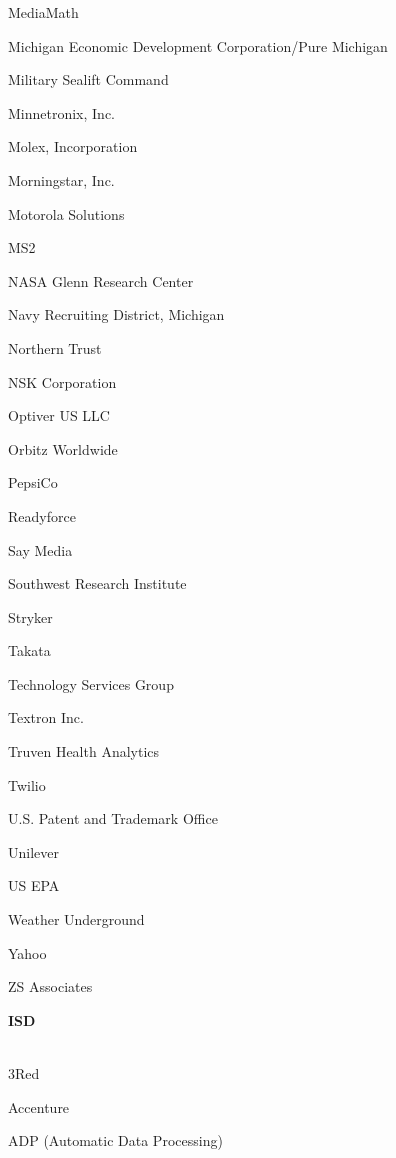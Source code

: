 \documentclass[twoside]{article}
\begin{document}
\begin{center}
\begin{multicols}{5}
\begin{FlushLeft}
\begin{compactitem}
\item MediaMath
\item Michigan Economic Development Corporation/Pure Michigan
\item Military Sealift Command
\item Minnetronix, Inc.
\item Molex, Incorporation
\item Morningstar, Inc.
\item Motorola Solutions
\item MS2
\item NASA Glenn Research Center
\item Navy Recruiting District, Michigan
\item Northern Trust
\item NSK Corporation
\item Optiver US LLC
\item Orbitz Worldwide
\item PepsiCo
\item Readyforce
\item Say Media
\item Southwest Research Institute
\item Stryker
\item Takata
\item Technology Services Group
\item Textron Inc.
\item Truven Health Analytics
\item Twilio
\item U.S. Patent and Trademark Office
\item Unilever
\item US EPA
\item Weather Underground
\item Yahoo
\item ZS Associates
\end{compactitem}
        \end{FlushLeft}
        \vspace{1em}
        {\fontsize{14}{16}\selectfont \bf ISD}\\
        \vspace{-1em}
        ~\hrulefill~
        \vspace{-.9em}
        \begin{FlushLeft}
        \begin{compactitem}
        \item 3Red
\item Accenture
\item ADP (Automatic Data Processing)

\end{compactitem}
\end{FlushLeft}
\end{multicols}
\end{center}
\end{document}
